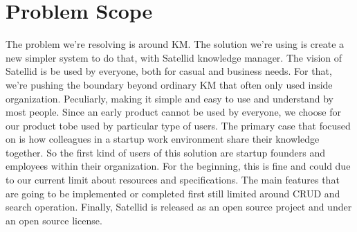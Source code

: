 \section{Problem Scope}
\label{sec:problem-scope}

The problem we're resolving is around \ac{KM}.
The solution we're using is create a new simpler system to do that, with Satellid knowledge manager.
The vision of Satellid is be used by everyone, both for casual and business needs.
For that, we're pushing the boundary beyond ordinary \ac{KM} that often only used inside organization.
Peculiarly, making it simple and easy to use and understand by most people.
Since an early product cannot be used by everyone, we choose for our product tobe used by particular type of users.
The primary case that focused on is how colleagues in a startup work environment share their knowledge together.
So the first kind of users of this solution are startup founders and employees within their organization.
For the beginning, this is fine and could due to our current limit about resources and specifications.
The main features that are going to be implemented or completed first still limited around \ac{CRUD} and search operation.
Finally, Satellid is released as an open source project and under an open source license.
